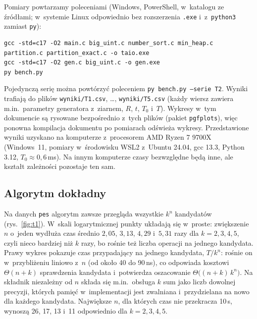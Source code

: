 \documentclass[11pt]{article}
\begin{document}
Pomiary powtarzamy poleceniami (Windows, PowerShell, w~katalogu ze źródłami; w~systemie
Linux odpowiednio bez rozszerzenia \texttt{.exe} i~z~\texttt{python3} zamiast \texttt{py}):
{\footnotesize
\begin{verbatim}
gcc -std=c17 -O2 main.c big_uint.c number_sort.c min_heap.c partition.c partition_exact.c -o taio.exe
gcc -std=c17 -O2 gen.c big_uint.c -o gen.exe
py bench.py
\end{verbatim}}
\noindent Pojedynczą serię można powtórzyć poleceniem \texttt{py bench.py --serie T2}.
Wyniki trafiają do plików \texttt{wyniki/T1.csv}, \dots, \texttt{wyniki/T5.csv}
(każdy wiersz zawiera m.in.\ parametry generatora z~ziarnem, \(R\), \(t\), \(T_0\) i~\(T\)).
Wykresy w~tym dokumencie są rysowane bezpośrednio z~tych plików (pakiet \texttt{pgfplots}),
więc ponowna kompilacja dokumentu po pomiarach odświeża wykresy. Przedstawione wyniki
uzyskano na komputerze z~procesorem AMD Ryzen 7 9700X (Windows~11, pomiary w~środowisku
WSL2 z~Ubuntu 24.04, gcc 13.3, Python 3.12, \(T_0\approx0{,}6\)\,ms). Na innym komputerze
czasy bezwzględne będą inne, ale kształt zależności pozostaje ten sam.

\tabTjeden
{}\tabTdwa
{}\tabTtrzy

\subsection{Algorytm dokładny}

Na danych \texttt{pes} algorytm zawsze przegląda wszystkie \(k^n\) kandydatów
(rys.~\ref{fig:t1}). W~skali logarytmicznej punkty układają się w~proste: zwiększenie \(n\)
o~jeden wydłuża czas średnio \(2{,}05\), \(3{,}13\), \(4{,}29\) i~\(5{,}31\) razy dla
\(k=2,3,4,5\), czyli nieco bardziej niż \(k\) razy, bo rośnie też liczba operacji na
jednego kandydata. Prawy wykres pokazuje czas przypadający na jednego kandydata,
\(T/k^n\): rośnie on w~przybliżeniu liniowo z~\(n\) (od około 40 do 90\,ns), co odpowiada
kosztowi \(\Theta(n+k)\) sprawdzenia kandydata i~potwierdza oszacowanie
\(\Theta\bigl((n+k)\,k^n\bigr)\). Na składnik niezależny od \(n\) składa się m.in.\ obsługa
\(k\) sum jako liczb dowolnej precyzji, których pamięć w~implementacji jest zwalniana
i~przydzielana na nowo dla każdego kandydata. Największe \(n\), dla których czas nie
przekracza 10\,s, wynoszą 26, 17, 13 i~11 odpowiednio dla \(k=2,3,4,5\).
\end{document}
